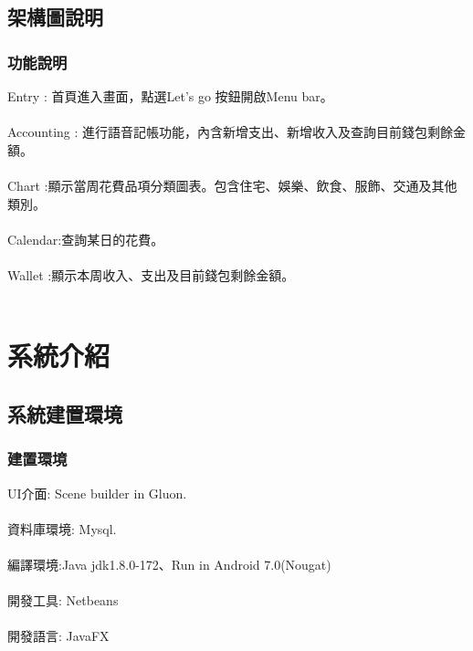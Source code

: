 \documentclass{beamer}
\begin{document}

\subsection{架構圖說明} %

\begin{frame}
\frametitle{功能說明}
Entry : 首頁進入畫面，點選Let's go 按鈕開啟Menu bar。\\~\\
Accounting : 進行語音記帳功能，內含新增支出、新增收入及查詢目前錢包剩餘金額。\\~\\
Chart :顯示當周花費品項分類圖表。包含住宅、娛樂、飲食、服飾、交通及其他類別。\\~\\
Calendar:查詢某日的花費。\\~\\
Wallet :顯示本周收入、支出及目前錢包剩餘金額。\\~\\

\end{frame}

\section{系統介紹} %


\subsection{系統建置環境} %
\begin{frame}
\frametitle{建置環境}
UI介面: Scene builder in Gluon.\\~\\

資料庫環境: Mysql. \\~\\

編譯環境:Java jdk1.8.0-172、Run in Android 7.0(Nougat) \\~\\

開發工具: Netbeans  \\~\\

開發語言: JavaFX  \\~\\

\end{frame}
\end{document}
